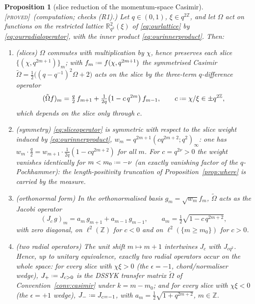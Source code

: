 \documentclass[11pt,a4paper]{article}
\providecommand{\coloneqq}{\mathrel{\vcenter{\baselineskip0.5ex \lineskiplimit0pt
      \hbox{\scriptsize.}\hbox{\scriptsize.}}}=}
\newcommand{\PROVED}{{\color{ForestGreen}\textsc{[proved]}}}
\theoremstyle{definition}
\theoremstyle{plain}
\newtheorem{proposition}[definition]{Proposition}
\newcommand{\Cas}{\Omega}                       %
\newcommand{\tCas}{\tilde\Omega}                %
\newcommand{\Z}{\mathbb{Z}}
\newcommand{\R}{\mathbb{R}}
\begin{document}
\begin{proposition}[slice reduction of the momentum-space Casimir]\label{prop:slicereduction}
\PROVED\ (computation; checks (R1).) Let $q\in(0,1)$, $\xi\in q^{2\Z}$, and let $\Cas$ act on
functions on the restricted lattice $\R^{2}_{q^{2}}(\xi)$ of \eqref{eq:ourlattice} by
\eqref{eq:ourradialoperator}, with the inner product \eqref{eq:ourinnerproduct}. Then:
\begin{enumerate}[label=(\alph*)]
\item \emph{(slices)} $\Cas$ commutes with multiplication by $\chi$, hence preserves each slice
$\{(\chi, q^{2m+1})\}_{m}$; with $f_{m}\coloneqq f(\chi,q^{2m+1})$ the symmetrised Casimir
$\tCas=\tfrac12\bigl((q-q^{-1})^{2}\Cas+2\bigr)$ acts on the slice by the three-term
$q$-difference operator
\begin{equation}\label{eq:sliceoperator}
  (\tCas f)_{m}=\tfrac{q}{2}\,f_{m+1}+\tfrac{1}{2q}\bigl(1-c\,q^{2m}\bigr)\,f_{m-1},
  \qquad c\coloneqq\chi/\xi\in\pm q^{2\Z},
\end{equation}
which depends on the slice only through $c$.
\item \emph{(symmetry)} \eqref{eq:sliceoperator} is symmetric with respect to the slice weight
induced by \eqref{eq:ourinnerproduct},
$w_{m}=q^{2m+1}(cq^{2m+2};q^{2})_{\infty}$: one has $w_{m}\cdot\tfrac{q}{2}
=w_{m+1}\cdot\tfrac{1}{2q}(1-cq^{2m+2})$ for all $m$. For $c=q^{2\nu}>0$ the weight vanishes
identically for $m<m_{0}\coloneqq-\nu$ (an exactly vanishing factor of the $q$-Pochhammer):
the length-positivity truncation of Proposition~\ref{prop:where} is carried by the measure.
\item \emph{(orthonormal form)} In the orthonormalised basis $g_{m}=\sqrt{w_{m}}f_{m}$, $\tCas$
acts as the Jacobi operator
\begin{equation}\label{eq:Jc}
  (J_{c}\,g)_{m}=a_{m}\,g_{m+1}+a_{m-1}\,g_{m-1},\qquad
  a_{m}=\tfrac12\sqrt{1-c\,q^{2m+2}},
\end{equation}
with zero diagonal, on $\ell^{2}(\Z)$ for $c<0$ and on $\ell^{2}(\{m\ge m_{0}\})$ for $c>0$.
\item \emph{(two radial operators)} The unit shift $m\mapsto m+1$ intertwines $J_{c}$ with
$J_{cq^{2}}$. Hence, up to unitary equivalence, exactly \emph{two} radial operators occur on
the whole space: for every slice with $\chi\xi>0$ (the $\epsilon=-1$, chord/normaliser wedge),
$J_{+}\coloneqq J_{c>0}$ \emph{is the DSSYK transfer matrix} $\tCas$ of
Convention~\ref{conv:casimir} under $k=m-m_{0}$; and for every slice with $\chi\xi<0$ (the
$\epsilon=+1$ wedge), $J_{-}\coloneqq J_{c=-1}$, with $a_{m}=\tfrac12\sqrt{1+q^{2m+2}}$,
$m\in\Z$.
\end{enumerate}
\end{proposition}
\end{document}
